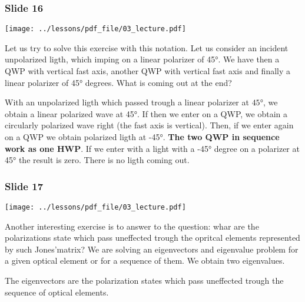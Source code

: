 \documentclass[../main/main.tex]{subfiles}
\begin{document}
\subsubsection*{Slide 16}

\begin{minipage}[]{0.5\linewidth}
\centering
\texttt{[image: ../lessons/pdf\_file/03\_lecture.pdf]}
\end{minipage}
\hspace{0.3cm}\vspace{0.3cm}
\begin{minipage}[c]{0.47\linewidth}

Let us try to solve this exercise with this notation. Let us consider an incident unpolarized ligth, which imping on a linear polarizer of 45°. We have then a QWP with vertical fast axis, another QWP with vertical fast axis and finally a linear polarizer of 45° degrees.
What is coming out at the end?

With an unpolarized ligth which passed trough a linear polarizer at \( 45° \), we obtain a linear polarized wave at 45°. If then we enter on a QWP, we obtain a circularly polarized wave right (the fast axis is vertical). Then, if we enter again on a QWP we obtain polarized ligth at -45°. \textbf{The two QWP in sequence work as one HWP}. If we enter with a light with a -45° degree on a polarizer at 45° the result is zero. There is no ligth coming out.

\end{minipage}

\subsubsection*{Slide 17}

\begin{minipage}[]{0.5\linewidth}
\centering
\texttt{[image: ../lessons/pdf\_file/03\_lecture.pdf]}
\end{minipage}
\hspace{0.3cm}\vspace{0.3cm}
\begin{minipage}[c]{0.47\linewidth}

Another interesting exercise is to answer to the question: whar are the polarizations state which pass uneffected trough the opritcal elements represented by such Jones'matrix?
We are solving an eigenvectors and eigenvalue problem for a given optical element or for a sequence of them.
We obtain two eigenvalues.

The eigenvectors are the polarization states which pass uneffected trough the sequence of optical elements.

\end{minipage}
\end{document}
